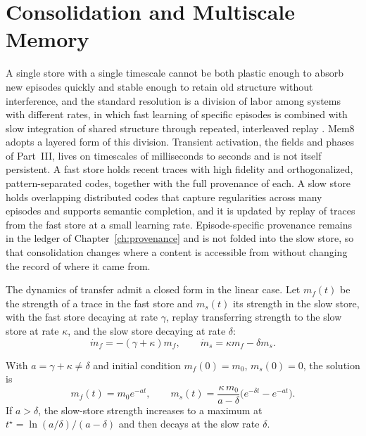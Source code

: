 \chapter{Consolidation and Multiscale Memory}\label{ch:consolidation}

A single store with a single timescale cannot be both plastic enough to absorb new episodes quickly and stable enough to retain old structure without interference, and the standard resolution is a division of labor among systems with different rates, in which fast learning of specific episodes is combined with slow integration of shared structure through repeated, interleaved replay \cite{mcclelland1995}. Mem8 adopts a layered form of this division. Transient activation, the fields and phases of Part~III, lives on timescales of milliseconds to seconds and is not itself persistent. A fast store holds recent traces with high fidelity and orthogonalized, pattern-separated codes, together with the full provenance of each. A slow store holds overlapping distributed codes that capture regularities across many episodes and supports semantic completion, and it is updated by replay of traces from the fast store at a small learning rate. Episode-specific provenance remains in the ledger of Chapter~\ref{ch:provenance} and is not folded into the slow store, so that consolidation changes where a content is accessible from without changing the record of where it came from.

The dynamics of transfer admit a closed form in the linear case. Let $m_f(t)$ be the strength of a trace in the fast store and $m_s(t)$ its strength in the slow store, with the fast store decaying at rate $\gamma$, replay transferring strength to the slow store at rate $\kappa$, and the slow store decaying at rate $\delta$:
\begin{equation}\label{eq:twostore}
\dot m_f=-(\gamma+\kappa)m_f,\qquad \dot m_s=\kappa m_f-\delta m_s.
\end{equation}

\begin{proposition}\label{prop:twostore}
With $a=\gamma+\kappa\ne\delta$ and initial condition $m_f(0)=m_0$, $m_s(0)=0$, the solution is
\begin{equation}
m_f(t)=m_0e^{-at},\qquad m_s(t)=\frac{\kappa\,m_0}{a-\delta}\bigl(e^{-\delta t}-e^{-at}\bigr).
\end{equation}
If $a>\delta$, the slow-store strength increases to a maximum at $t^\star=\ln(a/\delta)/(a-\delta)$ and then decays at the slow rate $\delta$.
\end{proposition}

